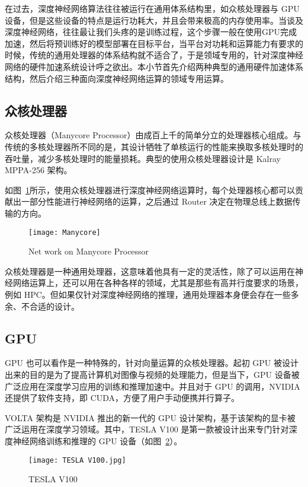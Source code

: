 在过去，深度神经网络算法往往被运行在通用体系结构里，如众核处理器与 GPU 设备，但是这些设备的特点是运行功耗大，并且会带来极高的内存使用率。当谈及深度神经网络，往往最让我们头疼的是训练过程，这个步骤一般在使用GPU完成加速，然后将预训练好的模型部署在目标平台，当平台对功耗和运算能力有要求的时候，传统的通用处理器的体系结构就不适合了，于是领域专用的，针对深度神经网络的硬件加速系统设计呼之欲出。本小节首先介绍两种典型的通用硬件加速体系结构，然后介绍三种面向深度神经网络运算的领域专用运算。

\subsection{众核处理器}

众核处理器（Manycore Processor）由成百上千的简单分立的处理器核心组成。与传统的多核处理器所不同的是，其设计牺牲了单核运行的性能来换取多核处理时的吞吐量，减少多核处理时的能量损耗。典型的使用众核处理器设计是 Kalray MPPA-256 架构。

如图~\ref{fig:Manycore}所示，使用众核处理器进行深度神经网络运算时，每个处理器核心都可以贡献出一部分性能进行神经网络的运算，之后通过 Router 决定在物理总线上数据传输的方向。

\begin{figure}[!htbp]
    \centering
    \texttt{[image: Manycore]}
    \caption{Net work on Manycore Processor}
    \label{fig:Manycore}
\end{figure}

众核处理器是一种通用处理器，这意味着他具有一定的灵活性，除了可以运用在神经网络运算上，还可以用在各种各样的领域，尤其是那些有高并行度要求的场景，例如 HPC。但如果仅针对深度神经网络的推理，通用处理器本身便会存在一些多余、不合适的设计。 

\subsection{GPU}

GPU 也可以看作是一种特殊的，针对向量运算的众核处理器。起初 GPU 被设计出来的目的是为了提高计算机对图像与视频的处理能力，但是当下，GPU 设备被广泛应用在深度学习应用的训练和推理加速中。并且对于 GPU 的调用，NVIDIA 还提供了软件支持，即 CUDA，方便了用户手动便携并行算子。

VOLTA 架构是 NVIDIA 推出的新一代的 GPU 设计架构，基于该架构的显卡被广泛运用在深度学习领域。其中，TESLA V100 是第一款被设计出来专门针对深度神经网络训练和推理的 GPU 设备（如图~\ref{fig:TESLA V100}）。

\begin{figure}[!htbp]
    \centering
    \texttt{[image: TESLA V100.jpg]}
    \caption{TESLA V100}
    \label{fig:TESLA V100}
\end{figure}

